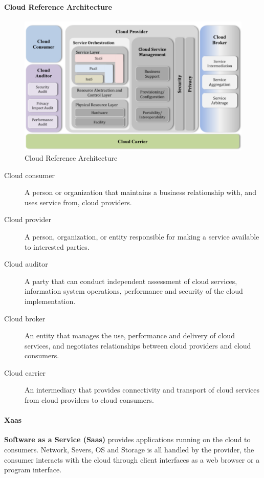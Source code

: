 \paragraph{Cloud Reference Architecture}
\begin{figure}[H]
  \centering
  \includegraphics[width=.8\textwidth]{images/cloud_reference_architecture.png}
  \caption{Cloud Reference Architecture}
\end{figure}
\begin{description}
  \item[Cloud consumer] A person or organization that maintains a business relationship with, and uses service from, cloud providers.
  \item[Cloud provider] A person, organization, or entity responsible for making a service available to interested parties.
  \item[Cloud auditor] A party that can conduct independent assessment of cloud services, information system operations, performance and security of the cloud implementation.
  \item[Cloud broker] An entity that manages the use, performance and delivery of cloud services, and negotiates relationships between cloud providers and cloud consumers.
  \item[Cloud carrier] An intermediary that provides connectivity and transport of cloud services from cloud providers to cloud consumers.
\end{description}

\paragraph{Xaas}
\textbf{Software as a Service (Saas)} provides applications running on the cloud to consumers.
Network, Severs, OS and Storage is all handled by the provider, the consumer interacts with the cloud through client interfaces as a web browser or a program interface.\\

